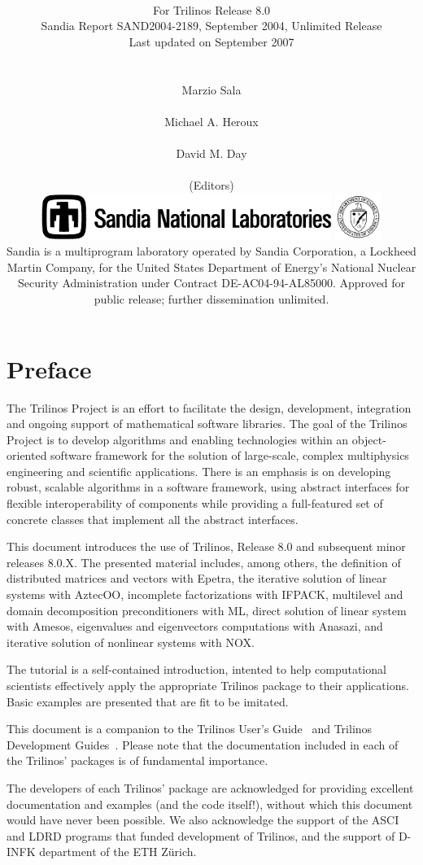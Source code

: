 \documentclass[final]{colabarticle}
\title{\textbf{\resizebox{10cm}{!}{Trilinos Tutorial}}\vspace{5mm}}
\subtitle{
  \\
  \vspace*{4mm}
  \Large For Trilinos Release 8.0 \\
  \vspace*{5mm}
  \noindent
  Sandia Report SAND2004-2189,
  September 2004,
  Unlimited Release \\
  \vspace*{5mm}
  \noindent
  Last updated on September 2007 \\
\vspace{6cm}\\
\\ \vspace{0mm}
\hspace*{1cm} Marzio Sala \\
\\ \vspace{0mm}
\hspace*{1cm} Michael A. Heroux\\
\\ \vspace{0mm}
\hspace*{1cm} David M. Day\\
\\ \vspace{0mm}
\hspace*{1cm} \normalsize (Editors) \\
\vspace*{1cm}
\vfill
\includegraphics[height=1.5cm]{snllineblk}  \hfill
\includegraphics[height=1.5cm]{DOEbwlogo}  \\
Sandia is a multiprogram laboratory operated by Sandia Corporation,
a Lockheed Martin Company, for the United States Department of Energy's
National Nuclear Security Administration under Contract DE-AC04-94-AL85000.
Approved for public release; further dissemination unlimited.
}
\newcommand{\Trilinos}{Trilinos}
\begin{document}
\maketitle

\chapter*{Preface}
  The Trilinos Project is an effort to facilitate the design,
  development, integration and ongoing support of mathematical software
  libraries.  The goal of the Trilinos Project is to develop algorithms
  and enabling technologies within an object-oriented software
  framework for the solution of large-scale, complex multiphysics
  engineering and scientific applications. There is an emphasis is on 
  developing robust, scalable algorithms in a software framework, using
  abstract interfaces for flexible interoperability of components while
  providing a full-featured set of concrete classes that implement all
  the abstract interfaces.

  \medskip

  This document introduces the use of \Trilinos{}, Release 8.0 and
  subsequent minor releases 8.0.X.  The
  presented material includes, among others, the definition of
  distributed matrices and vectors with Epetra, the iterative solution
  of linear systems with AztecOO, incomplete factorizations with IFPACK,
  multilevel and domain decomposition preconditioners with ML, direct
  solution of linear system with Amesos,
  eigenvalues and eigenvectors computations with Anasazi,
  and iterative solution of nonlinear systems with NOX.

  The tutorial is a self-contained introduction, intented to help
  computational scientists effectively apply the appropriate Trilinos
  package to their applications. Basic examples are presented that are
  fit to be imitated.

  \medskip

  This document is a companion to the Trilinos User's
  Guide~\cite{Trilinos-Users-Guide} and Trilinos Development
  Guides~\cite{Trilinos-Dev-Guide,Trilinos-Dev-Guide-II}. Please note
  that the documentation included in each of the Trilinos' packages is
  of fundamental importance.

  \bigskip

  The developers of each Trilinos' package are acknowledged for providing
  excellent documentation and examples (and the code itself!),
  without which this document would have never been possible.  We also
  acknowledge the support of the ASCI and LDRD programs that funded
  development of Trilinos, and the support of D-INFK department of the ETH
  Z\"urich.
\end{document}
